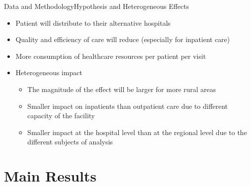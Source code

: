 \documentclass{beamer}
\theoremstyle{definition}
\begin{document}
\begin{frame}{Data and Methodology}{Hypothesis and Heterogeneous Effects}

\begin{itemize}
\setlength{\itemsep}{15pt}
    \item Patient will distribute to their alternative hospitals
    \item Quality and efficiency of care will reduce (especially for inpatient care)
    \item More consumption of healthcare resources per patient per visit
    \item Heterogeneous impact
    \begin{itemize}
    \setlength{\itemsep}{4pt}
        \item The magnitude of the effect will be larger for more rural areas %
        \item Smaller impact on inpatients than outpatient care due to different capacity of the facility %
        \item Smaller impact at the hospital level than at the regional level due to the different subjects of analysis %
    \end{itemize}
\end{itemize}

\end{frame}




\section{Main Results}

\end{document}
